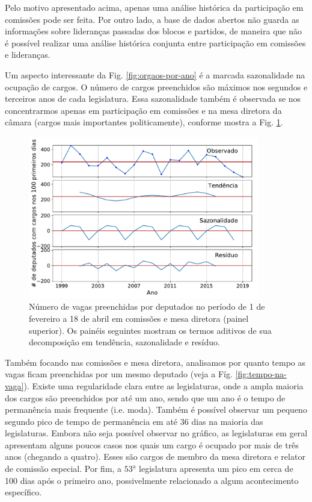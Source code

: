 \documentclass[12pt,a4paper]{article}
\begin{document}
Pelo motivo apresentado acima, apenas uma análise histórica da participação em comissões pode ser feita. Por outro lado,
a base de dados abertos não guarda as informações sobre lideranças passadas dos blocos e partidos, de maneira
que não é possível realizar uma análise histórica conjunta entre participação em comissões e lideranças.

Um aspecto interessante da Fig. \ref{fig:orgaos-por-ano} é a marcada sazonalidade na ocupação de cargos.
O número de cargos preenchidos são máximos nos segundos e terceiros anos de cada legislatura. Essa sazonalidade
também é observada se nos concentrarmos apenas em participação em comissões e na mesa diretora da câmara
(cargos mais importantes politicamente), conforme mostra a Fig. \ref{fig:cargos-por-ano}.

\begin{figure}[H]
\centering
\includegraphics[width=0.9\textwidth]{graficos/cargos_sazonalidade_2019-05-06.pdf}
\caption{Número de vagas preenchidas por deputados no período de 1 de fevereiro a 18
  de abril em comissões e mesa diretora (painel superior). Os painéis seguintes mostram os termos aditivos
  de sua decomposição em tendência, sazonalidade e resíduo.}
\label{fig:cargos-por-ano}
\end{figure} 

Também focando nas comissões e mesa diretora, analisamos por quanto tempo as vagas ficam preenchidas por um mesmo
deputado (veja a Fíg. \ref{fig:tempo-na-vaga}). Existe uma regularidade clara entre as legislaturas, onde a ampla
maioria dos cargos são preenchidos por até um ano, sendo que um ano é o tempo de permanência mais frequente
(i.e. moda). Também é possível observar um pequeno segundo pico de tempo de permanência em até 36 dias na maioria
das legislaturas. Embora não seja possível observar no gráfico, as legislaturas em geral apresentam alguns poucos
casos nos quais um cargo é ocupado por mais de três anos (chegando a quatro). Esses são cargos de membro da mesa
diretora e relator de comissão especial. Por fim, a $53^{\mathrm{\underline{a}}}$ legislatura apresenta um pico em cerca
de 100 dias após o primeiro ano, possivelmente relacionado a algum acontecimento específico.
\end{document}
